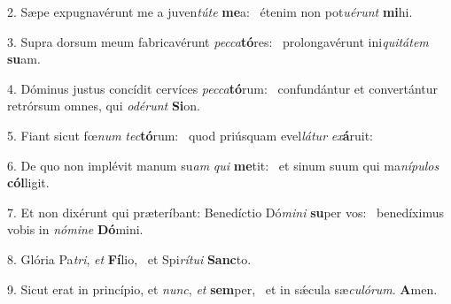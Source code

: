 2. Sæpe expugnavérunt me a juven\textit{tú}\textit{te} \textbf{me}a: \ast\  étenim non pot\textit{u}\textit{é}\textit{runt} \textbf{mi}hi.\

3. Supra dorsum meum fabricavérunt \textit{pec}\textit{ca}\textbf{tó}res: \ast\  prolongavérunt ini\textit{qui}\textit{tá}\textit{tem} \textbf{su}am.\

4. Dóminus justus concídit cervíces \textit{pec}\textit{ca}\textbf{tó}rum: \ast\  confundántur et convertántur retrórsum omnes, qui \textit{o}\textit{dé}\textit{runt} \textbf{Si}on.\

5. Fiant sicut fœ\textit{num} \textit{tec}\textbf{tó}rum: \ast\  quod priúsquam evel\textit{lá}\textit{tur} \textit{ex}\textbf{á}ruit:\

6. De quo non implévit manum su\textit{am} \textit{qui} \textbf{me}tit: \ast\  et sinum suum qui ma\textit{ní}\textit{pu}\textit{los} \textbf{cól}ligit.\

7. Et non dixérunt qui præteríbant: Benedíctio Dó\textit{mi}\textit{ni} \textbf{su}per vos: \ast\  benedíximus vobis in \textit{nó}\textit{mi}\textit{ne} \textbf{Dó}mini.\

8. Glória Pa\textit{tri}, \textit{et} \textbf{Fí}lio, \ast\  et Spi\textit{rí}\textit{tu}\textit{i} \textbf{Sanc}to.\

9. Sicut erat in princípio, et \textit{nunc}, \textit{et} \textbf{sem}per, \ast\  et in sǽcula sæ\textit{cu}\textit{ló}\textit{rum}. \textbf{A}men.\

